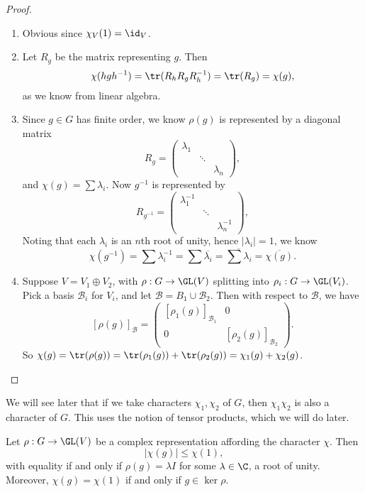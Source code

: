 \documentclass[a4paper]{article}
\begin{document}
\begin{proof}\leavevmode
  \begin{enumerate}
    \item Obvious since $\chi_V(1) = \id_V$.
    \item Let $R_g$ be the matrix representing $g$. Then
      \[
        \chi(hgh^{-1}) = \tr(R_h R_g R_h^{-1}) = \tr(R_g) = \chi(g),
      \]
      as we know from linear algebra.
    \item Since $g \in G$ has finite order, we know $\rho(g)$ is represented by a diagonal matrix
      \[
        R_g =
        \begin{pmatrix}
          \lambda_1\\
          & \ddots\\
          && \lambda_n
        \end{pmatrix},
      \]
      and $\chi(g) = \sum \lambda_i$. Now $g^{-1}$ is represented by
      \[
        R_{g^{-1}} =
        \begin{pmatrix}
          \lambda_1^{-1}\\
          & \ddots\\
          && \lambda_n^{-1}
        \end{pmatrix},
      \]
      Noting that each $\lambda_i$ is an $n$th root of unity, hence $|\lambda_i| = 1$, we know
      \[
        \chi(g^{-1}) = \sum \lambda_i^{-1} = \sum \overline{\lambda_i} = \overline{\sum \lambda_i} = \overline{\chi(g)}.
      \]
    \item Suppose $V = V_1 \oplus V_2$, with $\rho: G \to \GL(V)$ splitting into $\rho_i: G \to \GL(V_i)$. Pick a basis $\mathcal{B}_i$ for $V_i$, and let $\mathcal{B} = B_1 \cup \mathcal{B}_2$. Then with respect to $\mathcal{B}$, we have
      \[
        [\rho(g)]_{\mathcal{B}} =
        \begin{pmatrix}
          [\rho_1(g)]_{\mathcal{B}_1} & 0\\
          0 & [\rho_2(g)]_{\mathcal{B}_2}
        \end{pmatrix}.
      \]
      So $\chi(g) = \tr(\rho(g)) = \tr(\rho_1(g)) + \tr(\rho_2(g)) = \chi_1(g) + \chi_2(g)$.
  \end{enumerate}
\end{proof}
We will see later that if we take characters $\chi_1, \chi_2$ of $G$, then $\chi_1 \chi_2$ is also a character of $G$. This uses the notion of tensor products, which we will do later.

\begin{lemma}
  Let $\rho: G \to \GL(V)$ be a complex representation affording the character $\chi$. Then
  \[
    |\chi(g)| \leq \chi(1),
  \]
  with equality if and only if $\rho(g) = \lambda I$ for some $\lambda \in \C$, a root of unity. Moreover, $\chi(g) = \chi(1)$ if and only if $g \in \ker \rho$.
\end{lemma}
\end{document}

